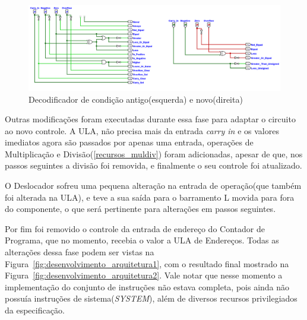 \documentclass[
	12pt,				%
	openright,			%
	oneside,			%
	a4paper,			%
	english,			%
	french,				%
	spanish,			%
	brazil,				%
	]{abntex2}
\begin{document}
\begin{figure}[h]
    \centering
    \includegraphics[width=1\linewidth]{ProcessoDesenvolvimento/Arquitetura/condition_decoder.png}
    \caption{Decodificador de condição antigo(esquerda) e novo(direita)}
    \label{fig:condition_decoder}
\end{figure}

Outras modificações foram executadas durante essa fase para adaptar o circuito ao novo controle. A ULA, não precisa mais da entrada \textit{carry in} e os valores imediatos agora são passados por apenas uma entrada, operações de Multiplicação e Divisão(\ref{recursos_muldiv}) foram adicionadas, apesar de que, nos passos seguintes a divisão foi removida, e finalmente o seu controle foi atualizado.

O Deslocador sofreu uma pequena alteração na entrada de operação(que também foi alterada na ULA), e teve a sua saída para o barramento L movida para fora do componente, o que será pertinente para alterações em passos seguintes.

Por fim foi removido o controle da entrada de endereço do Contador de Programa, que no momento, recebia o valor a ULA de Endereços. Todas as alterações dessa fase podem ser vistas na Figura~\ref{fig:desenvolvimento_arquitetura1}, com o resultado final mostrado na Figura~\ref{fig:desenvolvimento_arquitetura2}. Vale notar que nesse momento a implementação do conjunto de instruções não estava completa, pois ainda não possuía instruções de sistema(\textit{SYSTEM}), além de diversos recursos privilegiados da especificação.
\end{document}
